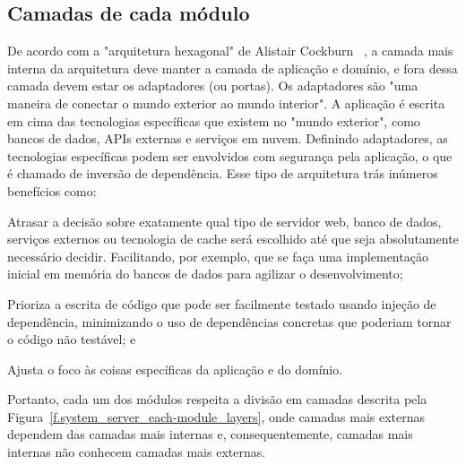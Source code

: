 \FloatBarrier

\subsection{Camadas de cada módulo}

De acordo com a "arquitetura hexagonal" de Alistair Cockburn ~\cite{hexagonal-architecture}, a camada mais interna da arquitetura deve manter a camada de aplicação e domínio, e fora dessa camada devem estar os adaptadores (ou portas). Os adaptadores são "uma maneira de conectar o mundo exterior ao mundo interior". A aplicação é escrita em cima das tecnologias específicas que existem no "mundo exterior", como bancos de dados, APIs externas e serviços em nuvem. Definindo adaptadores, as tecnologias específicas podem ser envolvidos com segurança pela aplicação, o que é chamado de inversão de dependência. Esse tipo de arquitetura trás inúmeros benefícios como: 

\begin{alineas}
	\item Atrasar a decisão sobre exatamente qual tipo de servidor web, banco de dados, serviços externos ou tecnologia de cache será escolhido até que seja absolutamente necessário decidir. Facilitando, por exemplo, que se faça uma implementação inicial em memória do bancos de dados para agilizar o desenvolvimento;
	\item Prioriza a escrita de código que pode ser facilmente testado usando injeção de dependência, minimizando o uso de dependências concretas que poderiam tornar o código não testável; e
	\item Ajusta o foco às coisas específicas da aplicação e do domínio.
\end{alineas}

Portanto, cada um dos módulos respeita a divisão em camadas descrita pela Figura~\ref{f.system_server_each-module_layers}, onde camadas mais externas dependem das camadas mais internas e, consequentemente, camadas mais internas não conhecem camadas mais externas. 

